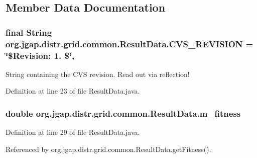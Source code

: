 \subsection{Member Data Documentation}
\hypertarget{classorg_1_1jgap_1_1distr_1_1grid_1_1common_1_1_result_data_a612767569fae841d20202e2d74d6a2ce}{
\subsubsection[{C\-V\-S\-\_\-\-R\-E\-V\-I\-S\-I\-O\-N}]{\setlength{\rightskip}{0pt plus 5cm}final String org.\-jgap.\-distr.\-grid.\-common.\-Result\-Data.\-C\-V\-S\-\_\-\-R\-E\-V\-I\-S\-I\-O\-N = \char`\"{}\$Revision\-: 1. \$\char`\"{}\hspace{0.3cm}{\ttfamily [static]}, {\ttfamily [private]}}}\label{classorg_1_1jgap_1_1distr_1_1grid_1_1common_1_1_result_data_a612767569fae841d20202e2d74d6a2ce}
String containing the C\-V\-S revision. Read out via reflection! 

Definition at line 23 of file Result\-Data.\-java.

\hypertarget{classorg_1_1jgap_1_1distr_1_1grid_1_1common_1_1_result_data_a0918e2f3f8abc3db1101d66518104fff}{
\subsubsection[{m\-\_\-fitness}]{\setlength{\rightskip}{0pt plus 5cm}double org.\-jgap.\-distr.\-grid.\-common.\-Result\-Data.\-m\-\_\-fitness\hspace{0.3cm}{\ttfamily [private]}}}\label{classorg_1_1jgap_1_1distr_1_1grid_1_1common_1_1_result_data_a0918e2f3f8abc3db1101d66518104fff}


Definition at line 29 of file Result\-Data.\-java.



Referenced by org.\-jgap.\-distr.\-grid.\-common.\-Result\-Data.\-get\-Fitness().

